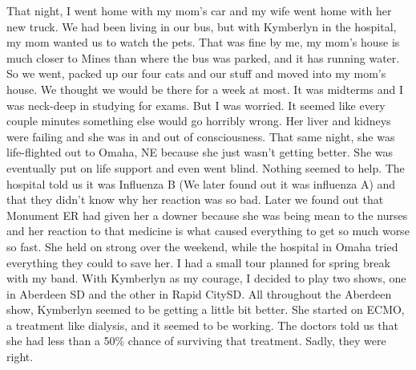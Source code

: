 That night, I went home with my mom's car and my wife went home with her new truck.
We had been living in our bus, but with Kymberlyn in the hospital, my mom wanted us to watch the pets.
That was fine by me, my mom's house is much closer to Mines than where the bus was parked, and it has 
running water.
So we went, packed up our four cats and our stuff and moved into my mom's house. 
We thought we would be there for a week at most.
It was midterms and I was neck-deep in studying for exams.
But I was worried.
It seemed like every couple minutes something else would go horribly wrong.
Her liver and kidneys were failing and she was in and out of consciousness.
That same night, she was life-flighted out to Omaha, NE because she just wasn't getting better.
She was eventually put on life support and even went blind.
Nothing seemed to help. 
The hospital told us it was Influenza B (We later found out it was influenza A) and that
they didn't know why her reaction was so bad.
Later we found out that Monument ER had given her a downer because she was being mean to the 
nurses and her reaction to that medicine is what caused everything to get so much worse so fast.
She held on strong over the weekend, while the hospital in Omaha tried everything they could to 
save her.
I had a small tour planned for spring break with my band.
With Kymberlyn as my courage, I decided to play two shows, one in Aberdeen SD and the other
in Rapid City\@ SD\@.
All throughout the Aberdeen show, Kymberlyn seemed to be getting a little bit better. 
She started on ECMO, a treatment like dialysis, and it seemed to be working.
The doctors told us that she had less than a 50\% chance of surviving that treatment.
Sadly, they were right.

